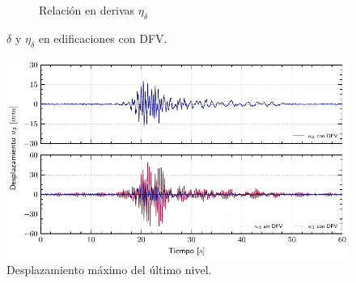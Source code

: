 \begin{figure}[!h]
\begin{subfigure}[b]{0.45\textwidth}
         \caption{\raggedleft Relación en derivas $\eta_{\delta}$ \hspace*{0.45cm}} 
         \label{Cap4_Figura4b}
     \end{subfigure}
        \caption[$\delta$ y $\eta_{\delta}$ en edificaciones con DFV]{\centering\footnotesize $\delta$ y $\eta_{\delta}$ en edificaciones con DFV.}
        \label{Cap4_Figura4}
     \vspace{5 mm}
	\end{figure}

	\begin{figure}[!h]
	\centering
		\includegraphics[scale=1]{E_IMAGENES/2_Capitulo4/Cap4_Imagen6.pdf}
		\vspace{-3 mm}
	\caption[Desplazamiento máximo del último nivel]{\centering\footnotesize Desplazamiento máximo del último nivel.}
	\label{Cap4_Figura5}
	\end{figure}



